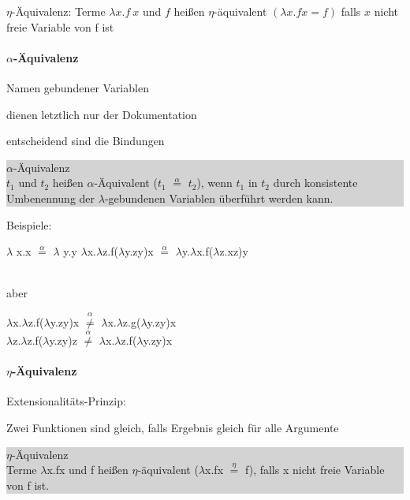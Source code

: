 \documentclass[10pt]{article}
\begin{document}
$\eta $-Äquivalenz: Terme $\lambda x. f\ x$ und $f$ heißen $\eta $-äquivalent $(\lambda x. f x = f )$ falls $x$ nicht freie Variable von f ist

\paragraph{$\alpha$-Äquivalenz}
Namen gebundener Variablen
\begin{itemize*}
  \item dienen letztlich nur der Dokumentation
  \item entscheidend sind die Bindungen
\end{itemize*}

\colorbox{lightgray}{
  \begin{minipage}[h]{1.0\linewidth}
    $\alpha$-Äquivalenz \\
    $	t_1$ und $t_2$ heißen $\alpha$-Äquivalent ($t_1$ $\stackrel{\alpha}{=}$ $t_2$), wenn $t_1$ in $t_2$ durch konsistente Umbenennung der $\lambda$-gebundenen Variablen überführt werden kann. 
  \end{minipage}
}

Beispiele: 
\begin{center}
  $\lambda$ x.x $\stackrel{\alpha}{=}$ $\lambda$ y.y \linebreak
  $\lambda$x.$\lambda$z.f($\lambda$y.zy)x $\stackrel{\alpha}{=}$ $\lambda$y.$\lambda$x.f($\lambda$z.xz)y
\end{center}
\ \\
aber
\begin{center} $\lambda$x.$\lambda$z.f($\lambda$y.zy)x $\stackrel{\alpha}{\neq}$ $\lambda$x.$\lambda$z.g($\lambda$y.zy)x\\ $\lambda$z.$\lambda$z.f($\lambda$y.zy)z $\stackrel{\alpha}{\neq}$ $\lambda$x.$\lambda$z.f($\lambda$y.zy)x
\end{center}

\paragraph{$\eta$-Äquivalenz}
Extensionalitäts-Prinzip: 
\begin{itemize*}
  \item Zwei Funktionen sind gleich, falls Ergebnis gleich für alle Argumente
\end{itemize*}
\colorbox{lightgray} {
  \begin{minipage}[h]{1.0\linewidth}
    $\eta$-Äquivalenz \\
    Terme $\lambda$x.fx und f heißen $\eta$-äquivalent ($\lambda$x.fx $\stackrel{\eta}{=}$ f), falls x nicht freie Variable von f ist.
  \end{minipage}
}
\end{document}
